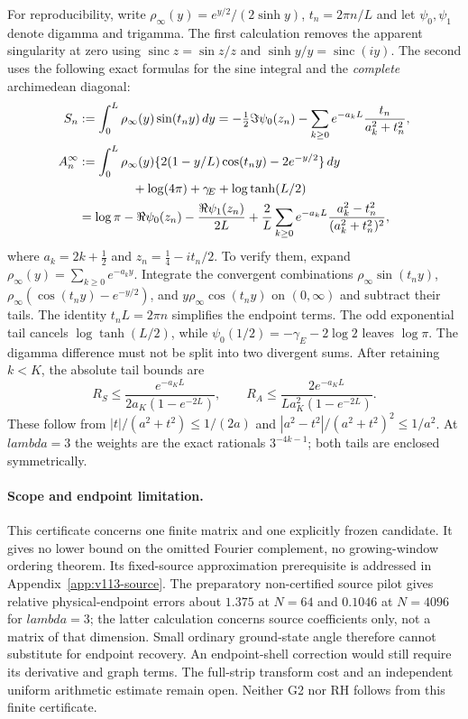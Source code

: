 \documentclass[11pt]{article}
\def\lambda{lambda}%
\theoremstyle{remark}
\begin{document}
For reproducibility, write $\rho_\infty(y)=e^{y/2}/(2\sinh y)$,
$t_n=2\pi n/L$ and let $\psi_0,\psi_1$ denote digamma and trigamma.
The first calculation removes the apparent singularity at zero using
$\operatorname{sinc}z=\sin z/z$ and
$\sinh y/y=\operatorname{sinc}(iy)$. The second uses the following
exact formulas for the sine integral and the \emph{complete}
archimedean diagonal:
\begin{align*}
 S_n&:=\int_0^L\rho_\infty(y)\sin(t_ny)\,dy
 =-\tfrac12\Im\psi_0(z_n)
   -\sum_{k\ge0}e^{-a_kL}\frac{t_n}{a_k^2+t_n^2},\\
 A_n^\infty&:=\int_0^L\rho_\infty(y)
  \{2(1-y/L)\cos(t_ny)-2e^{-y/2}\}\,dy\\
 &\hspace{15mm}+\log(4\pi)+\gamma_{\!E}+\log\tanh(L/2)\\
 &=\log\pi-\Re\psi_0(z_n)-\frac{\Re\psi_1(z_n)}{2L}
   +\frac2L\sum_{k\ge0}e^{-a_kL}
          \frac{a_k^2-t_n^2}{(a_k^2+t_n^2)^2},
\end{align*}
where $a_k=2k+\tfrac12$ and $z_n=\tfrac14-it_n/2$.
To verify them, expand $\rho_\infty(y)=\sum_{k\ge0}e^{-a_ky}$.
Integrate the convergent combinations
$\rho_\infty\sin(t_ny)$,
$\rho_\infty(\cos(t_ny)-e^{-y/2})$, and
$y\rho_\infty\cos(t_ny)$ on $(0,\infty)$ and subtract their tails.
The identity $t_nL=2\pi n$ simplifies the endpoint terms. The odd
exponential tail cancels $\log\tanh(L/2)$, while
$\psi_0(1/2)=-\gamma_{\!E}-2\log2$ leaves $\log\pi$.
The digamma difference must not be split into two divergent sums.
After retaining $k<K$, the absolute tail bounds are
\[
 R_S\le\frac{e^{-a_KL}}{2a_K(1-e^{-2L})},\qquad
 R_A\le\frac{2e^{-a_KL}}{La_K^2(1-e^{-2L})}.
\]
These follow from $|t|/(a^2+t^2)\le1/(2a)$ and
$|a^2-t^2|/(a^2+t^2)^2\le1/a^2$. At $\lambda=3$ the weights are
the exact rationals $3^{-4k-1}$; both tails are enclosed symmetrically.

\paragraph{Scope and endpoint limitation.}
This certificate concerns one finite matrix and one explicitly frozen
candidate. It gives no lower bound on the omitted Fourier complement,
no growing-window ordering theorem. Its fixed-source approximation
prerequisite is addressed in Appendix~\ref{app:v113-source}. The preparatory non-certified source pilot gives relative
physical-endpoint errors about $1.375$ at $N=64$ and $0.1046$ at
$N=4096$ for $\lambda=3$; the latter calculation concerns source
coefficients only, not a matrix of that dimension. Small ordinary
ground-state angle therefore cannot substitute for endpoint recovery.
An endpoint-shell correction would still require its derivative and
graph terms. The full-strip transform cost and an independent uniform
arithmetic estimate remain open. Neither G2 nor RH follows from this
finite certificate.
\end{document}
